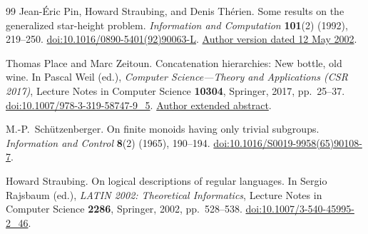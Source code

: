 \begin{thebibliography}{99}
Jean-\'Eric Pin, Howard Straubing, and Denis Th\'erien.
Some results on the generalized star-height problem.
\emph{Information and Computation} \textbf{101}(2) (1992), 219--250.
\href{https://doi.org/10.1016/0890-5401(92)90063-L}{doi:10.1016/0890-5401(92)90063-L}.
\href{https://www.irif.fr/~jep/PDF/StarHeight.pdf}{Author version dated 12 May 2002}.

Thomas Place and Marc Zeitoun.
Concatenation hierarchies: New bottle, old wine.
In Pascal Weil (ed.),
\emph{Computer Science---Theory and Applications (CSR 2017)},
Lecture Notes in Computer Science \textbf{10304},
Springer, 2017, pp.~25--37.
\href{https://doi.org/10.1007/978-3-319-58747-9_5}{doi:10.1007/978-3-319-58747-9\_5}.
\href{https://www.labri.fr/perso/zeitoun/research/pdf/2017_new_bottle.pdf}{Author extended abstract}.

M.-P.\ Sch\"utzenberger.
On finite monoids having only trivial subgroups.
\emph{Information and Control} \textbf{8}(2) (1965), 190--194.
\href{https://doi.org/10.1016/S0019-9958(65)90108-7}{doi:10.1016/S0019-9958(65)90108-7}.

Howard Straubing.
On logical descriptions of regular languages.
In Sergio Rajsbaum (ed.),
\emph{LATIN 2002: Theoretical Informatics},
Lecture Notes in Computer Science \textbf{2286},
Springer, 2002, pp.~528--538.
\href{https://doi.org/10.1007/3-540-45995-2_46}{doi:10.1007/3-540-45995-2\_46}.

\end{thebibliography}
